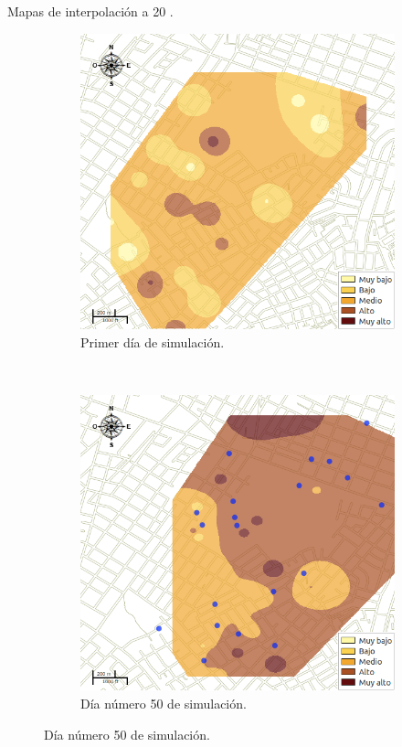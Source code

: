 \begin{frame}[t]{Mapas de interpolación a 20 \textcelsius.}
    \begin{figure}
    \begin{subfigure}[b]{0.45\textwidth}
        \includegraphics[width=\textwidth]{../book/capitulo-6/graphics/raster/temp-20-0.png}
        \caption{ Primer día de simulación.}
    \end{subfigure}
    ~~~~
    \begin{subfigure}[b]{0.45\textwidth}
        \includegraphics[width=\textwidth]{../book/capitulo-6/graphics/raster/temp-20-38.png}
        \caption{Día número 50 de simulación.}
    \end{subfigure}
    \end{figure}
\end{frame}

